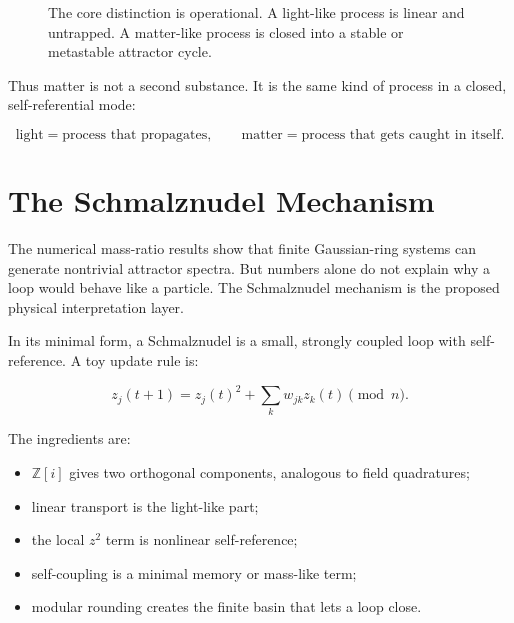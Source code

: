 \documentclass[11pt,a4paper]{article}
\newcommand{\ZGi}{\mathbb{Z}[i]}
\begin{document}
\begin{figure}[htbp]
\centering
{}
\caption{The core distinction is operational. A light-like process is linear
and untrapped. A matter-like process is closed into a stable or metastable
attractor cycle.}
\label{fig:linear_vs_loop}
\end{figure}

Thus matter is not a second substance. It is the same kind of process in a
closed, self-referential mode:

\[
\text{light} = \text{process that propagates},
\qquad
\text{matter} = \text{process that gets caught in itself}.
\]

\section{The Schmalznudel Mechanism}

The numerical mass-ratio results show that finite Gaussian-ring systems can
generate nontrivial attractor spectra. But numbers alone do not explain why a
loop would behave like a particle. The Schmalznudel mechanism is the proposed
physical interpretation layer.

In its minimal form, a Schmalznudel is a small, strongly coupled loop with
self-reference. A toy update rule is:

\[
z_j(t+1)
=
z_j(t)^2
+
\sum_k w_{jk} z_k(t)
\pmod n.
\]

The ingredients are:

\begin{itemize}
\item $\ZGi$ gives two orthogonal components, analogous to field quadratures;
\item linear transport is the light-like part;
\item the local $z^2$ term is nonlinear self-reference;
\item self-coupling is a minimal memory or mass-like term;
\item modular rounding creates the finite basin that lets a loop close.
\end{itemize}
\end{document}
